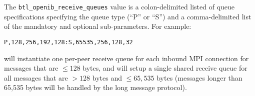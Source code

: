 The {\tt btl\_\-openib\_\-receive\_\-queues} value is a
colon-delimited listed of queue specifications specifying the queue
type (``P'' or ``S'') and a comma-delimited list of the mandatory and
optional sub-parameters.  For example:

\vspace{5pt}
\centerline{\tt P,128,256,192,128:S,65535,256,128,32}
\vspace{5pt}

will instantiate one per-peer receive queue for each inbound MPI
connection for messages that are $\le128$ bytes, and will setup a
single shared receive queue for all messages that are $>128$ bytes and
$\le65,535$ bytes (messages longer than 65,535 bytes will be handled
by the long message protocol).

